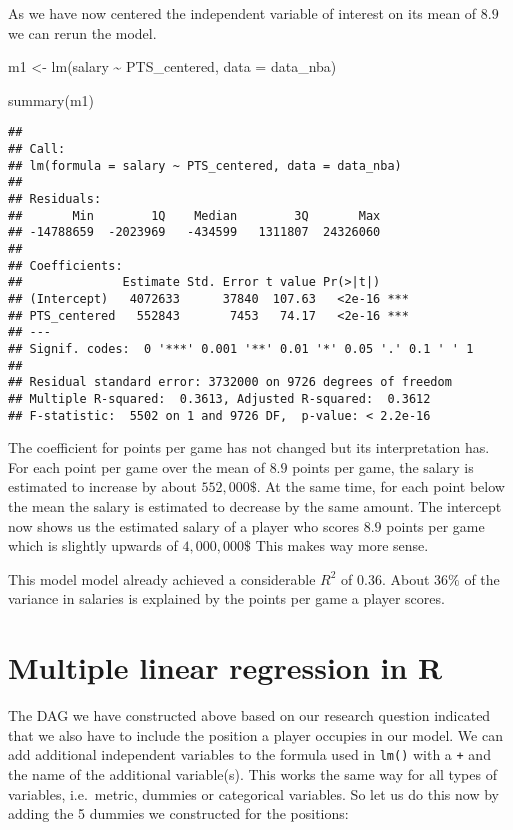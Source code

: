 \documentclass[
]{book}
\newenvironment{Shaded}{\begin{snugshade}}{\end{snugshade}}
\newcommand{\AttributeTok}[1]{\textcolor[rgb]{0.77,0.63,0.00}{#1}}
\newcommand{\AttributeTok}[1]{\textcolor[rgb]{0.13,0.29,0.53}{#1}}
\newcommand{\FunctionTok}[1]{\textcolor[rgb]{0.00,0.00,0.00}{#1}}
\newcommand{\FunctionTok}[1]{\textcolor[rgb]{0.13,0.29,0.53}{\textbf{#1}}}
\newcommand{\NormalTok}[1]{#1}
\newcommand{\OtherTok}[1]{\textcolor[rgb]{0.56,0.35,0.01}{#1}}
\newcommand{\SpecialCharTok}[1]{\textcolor[rgb]{0.00,0.00,0.00}{#1}}
\newcommand{\SpecialCharTok}[1]{\textcolor[rgb]{0.81,0.36,0.00}{\textbf{#1}}}
\begin{document}
As we have now centered the independent variable of interest on its mean of \(8.9\)
we can rerun the model.

\begin{Shaded}
\begin{Highlighting}[]
\NormalTok{m1 }\OtherTok{\textless{}{-}} \FunctionTok{lm}\NormalTok{(salary }\SpecialCharTok{\textasciitilde{}}\NormalTok{ PTS\_centered, }\AttributeTok{data =}\NormalTok{ data\_nba)}

\FunctionTok{summary}\NormalTok{(m1)}
\end{Highlighting}
\end{Shaded}

\begin{verbatim}
## 
## Call:
## lm(formula = salary ~ PTS_centered, data = data_nba)
## 
## Residuals:
##       Min        1Q    Median        3Q       Max 
## -14788659  -2023969   -434599   1311807  24326060 
## 
## Coefficients:
##              Estimate Std. Error t value Pr(>|t|)    
## (Intercept)   4072633      37840  107.63   <2e-16 ***
## PTS_centered   552843       7453   74.17   <2e-16 ***
## ---
## Signif. codes:  0 '***' 0.001 '**' 0.01 '*' 0.05 '.' 0.1 ' ' 1
## 
## Residual standard error: 3732000 on 9726 degrees of freedom
## Multiple R-squared:  0.3613, Adjusted R-squared:  0.3612 
## F-statistic:  5502 on 1 and 9726 DF,  p-value: < 2.2e-16
\end{verbatim}

The coefficient for points per game has not changed but its interpretation has.
For each point per game over the mean of \(8.9\) points per game, the salary is
estimated to increase by about \(552,000\$\). At the same time, for each point
below the mean the salary is estimated to decrease by the same amount.
The intercept now shows us the estimated salary of a player who scores \(8.9\)
points per game which is slightly upwards of \(4,000,000\$\) This makes way more
sense.

This model model already achieved a considerable \(R^2\) of \(0.36\). About \(36\%\)
of the variance in salaries is explained by the points per game a player scores.

\hypertarget{multiple-linear-regression-in-r}{%
\section{Multiple linear regression in R}\label{multiple-linear-regression-in-r}}

The DAG we have constructed above based on our research question indicated that
we also have to include the position a player occupies in our model.
We can add additional independent variables to the formula used in \texttt{lm()} with a
\texttt{+} and the name of the additional variable(s). This works the same way for all
types of variables, i.e.~metric, dummies or categorical variables.
So let us do this now by adding the 5 dummies we constructed for the positions:
\end{document}
